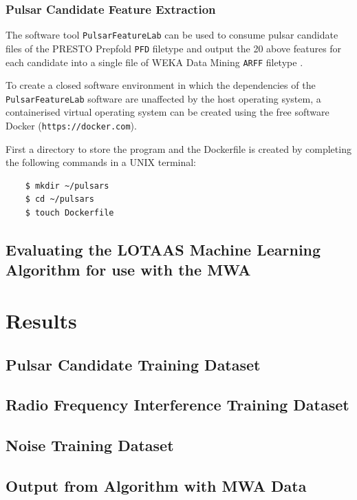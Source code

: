 \documentclass{article}
\begin{document}
\subsubsection{Pulsar Candidate Feature Extraction}

The software tool \verb|PulsarFeatureLab| can be used to consume pulsar candidate files of the PRESTO Prepfold \verb|PFD| filetype and output the 20 above features for each candidate into a single file of WEKA Data Mining \verb|ARFF| filetype \autocite{lyon}.

To create a closed software environment in which the dependencies of the \verb|PulsarFeatureLab| software are unaffected by the host operating system, a containerised virtual operating system can be created using the free software Docker (\verb|https://docker.com|).

First a directory to store the program and the Dockerfile is created by completing the following commands in a UNIX terminal:

\begin{center}
\begin{verbatim}
    $ mkdir ~/pulsars
    $ cd ~/pulsars
    $ touch Dockerfile
\end{verbatim}
\end{center}
    
\subsection{Evaluating the LOTAAS Machine Learning Algorithm for use with the MWA}

\pagebreak
\section{Results}
\subsection{Pulsar Candidate Training Dataset}
\subsection{Radio Frequency Interference Training Dataset}
\subsection{Noise Training Dataset}
\subsection{Output from Algorithm with MWA Data}
\end{document}
